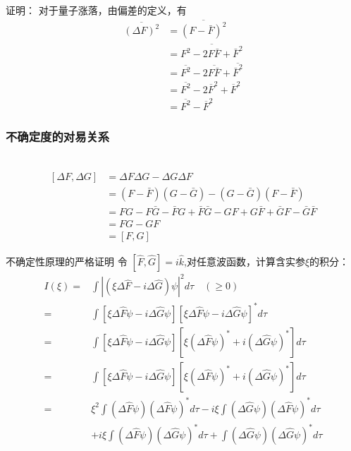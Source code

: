 \begin{frame} 
    \frametitle{}
    \alert{证明：} 对于量子涨落，由偏差的定义，有
    \begin{equation*}
        \begin{split} 
        \overline{(\Delta F)^2}&= \overline{(F-\bar{F})^2}\\
        &=\overline{F^2-2F\bar{F}+\bar{F}^2 }\\
        &=\overline{F^2} -2\overline{F\bar{F}} +\overline{\bar{F}^2 }\\
        &=\overline{F^2} -2\overline{F}^2 +\overline{F}^2\\
        &= \overline{F^2} - \overline{F}^2
        \end{split}  
    \end{equation*} 
\end{frame} 

\begin{frame} 
    \frametitle{不确定度的对易关系}
    \证~
    \begin{equation*}
        \begin{split} 
        [\Delta F, \Delta G]&= \Delta F \Delta G - \Delta G \Delta F \\
        &=(F-\bar{F}) (G-\bar{G})- (G-\bar{G}) (F-\bar{F}) \\
        &=FG -F\bar{G}-\bar{F}G + \bar{F} \bar{G} -GF + G \bar{F} + \bar{G} F -\bar{G} \bar{F}   \\
        &=FG-GF \\
        &=[F, G]
        \end{split}  
    \end{equation*} 
\end{frame} 

\begin{frame} {不确定性原理的严格证明}
    令 $[\hat{F}, \hat{G}]= i\hat{k}$,对任意波函数，计算含实参$\xi$的积分：
    $$
    \begin{aligned}
    I(\xi)= &\int|(\xi\Delta \hat{F}-i \Delta \hat{G}) \psi|^{2} d \tau \quad (\geq 0) \\
    =&\int[\xi \Delta \hat{F} \psi-i \Delta \hat{G} \psi][\xi \Delta \hat{F} \psi-i \Delta \hat{G} \psi]^{*} d \tau \\
    =&\int[\xi \Delta \hat{F} \psi-i \Delta \hat{G} \psi] [\xi(\Delta \hat{F} \psi)^{*}+i(\Delta \hat{G} \psi)^{*}] d \tau \\
    =&\int[\xi \Delta \hat{F} \psi-i \Delta \hat{G} \psi]\left[\xi(\Delta \hat{F} \psi)^{*}+i(\Delta \hat{G} \psi)^{*}\right] d \tau \\
    =& \xi^{2} \int(\Delta \hat{F} \psi)(\Delta \hat{F} \psi)^* d \tau-i \xi \int(\Delta \hat{G} \psi)(\Delta \hat{F} \psi)^* d \tau \\
        &+i \xi \int(\Delta \hat{F} \psi)(\Delta \hat{G} \psi)^* d \tau+\int(\Delta \hat{G} \psi)(\Delta \hat{G} \psi)^* d \tau \\
    \end{aligned}
    $$
\end{frame} 

